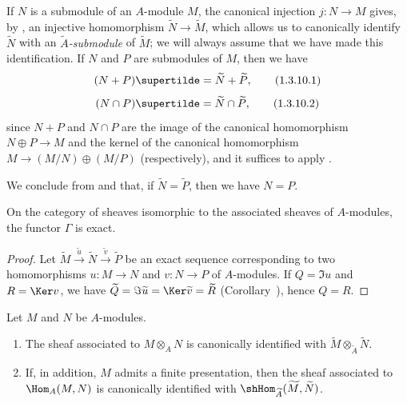 \begin{env}[1.3.10]
\label{I.1.3.10}
If $N$ is a submodule of an $A$-module $M$, the canonical injection $j:N\to M$ gives, by , an injective homomorphism $\widetilde{N}\to\widetilde{M}$, which allows us to canonically identify $\widetilde{N}$ with an \emph{$\widetilde{A}$-submodule} of $\widetilde{M}$;
we will always assume that we have made this identification.
If $N$ and $P$ are submodules of $M$, then we have
\[
\label{I.1.3.10.1}
  (N+P)\supertilde=\widetilde{N}+\widetilde{P},
  \tag{1.3.10.1}
\]
\[
\label{I.1.3.10.2}
  (N\cap P)\supertilde=\widetilde{N}\cap\widetilde{P},
  \tag{1.3.10.2}
\]
since $N+P$ and $N\cap P$ are the image of the canonical homomorphism
$N\oplus P\to M$ and the kernel of the canonical homomorphism $M\to(M/N)\oplus(M/P)$ (respectively), and it suffices to apply .

We conclude from  and  that, if $\widetilde{N}=\widetilde{P}$, then we have $N=P$.
\end{env}

\begin{corollary}[1.3.11]
\label{I.1.3.11}
On the category of sheaves isomorphic to the associated sheaves of $A$-modules, the functor $\Gamma$ is exact.
\end{corollary}

\begin{proof}
Let $\widetilde{M}\xrightarrow{\widetilde{u}}\widetilde{N}\xrightarrow{\widetilde{v}}\widetilde{P}$ be an exact sequence corresponding to two homomorphisms $u:M\to N$ and $v:N\to P$ of $A$-modules.
If $Q=\Im u$ and $R=\Ker v$, we have $\widetilde{Q}=\Im\widetilde{u}=\Ker\widetilde{v}=\widetilde{R}$ (Corollary~), hence $Q=R$.
\end{proof}

\begin{corollary}[1.3.12]
\label{I.1.3.12}
Let $M$ and $N$ be $A$-modules.
\begin{enumerate}
  \item[{\rm(i)}] The sheaf associated to $M\otimes_A N$ is canonically identified with $\widetilde{M}\otimes_{\widetilde{A}}\widetilde{N}$.
  \item[{\rm(ii)}] If, in addition, $M$ admits a finite presentation, then the sheaf associated to $\Hom_A(M,N)$ is canonically identified with $\shHom_{\widetilde{A}}(\widetilde{M},\widetilde{N})$.
\end{enumerate}
\end{corollary}


